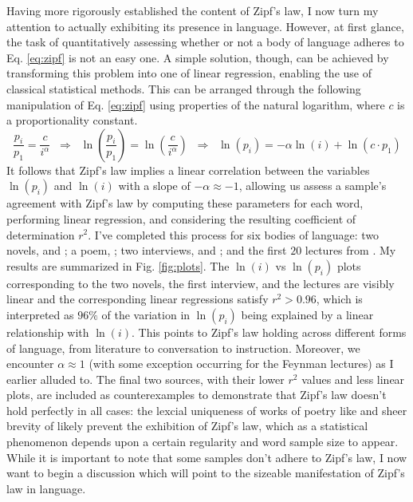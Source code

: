 \documentclass[10pt]{article}
\begin{document}
\begin{flushleft}
    \hspace*{0.5in} Having more rigorously established the content of Zipf's law, I now turn my attention to actually exhibiting its presence in language. However, at first glance, the task of quantitatively assessing whether or not a body of language adheres to Eq. \ref{eq:zipf} is not an easy one. A simple solution, though, can be achieved by transforming this problem into one of linear regression, enabling the use of classical statistical methods. This can be arranged through the following manipulation of Eq. \ref{eq:zipf} using properties of the natural logarithm, where $c$ is a proportionality constant.
    \begin{equation}
        \frac{p_i}{p_1} = \frac{c}{i^\alpha} \;\; \Longrightarrow \;\; \ln\left(\frac{p_i}{p_1}\right) = \ln\left(\frac{c}{i^\alpha}\right) \;\; \Longrightarrow \;\; \ln(p_i) = -\alpha\ln(i) + \ln(c \cdot p_1) \label{eq:log}
    \end{equation}
    It follows that Zipf's law implies a linear correlation between the variables $\ln(p_i)$ and $\ln(i)$ with a slope of $-\alpha \approx -1$, allowing us assess a sample's agreement with Zipf's law by computing these parameters for each word, performing linear regression, and considering the resulting coefficient of determination $r^2$. I've completed this process for six bodies of language: two novels, \textcite{Moby-Dick} and \textcite{Ulysses}; a poem, \textcite{paradiselost}; two interviews, \textcite{trump} and \textcite{capone}; and the first $20$ lectures from \textcite{feynman}. My results are summarized in Fig. \ref{fig:plots}. The $\ln(i)$ vs $\ln(p_i)$ plots corresponding to the two novels, the first interview, and the lectures are visibly linear and the corresponding linear regressions satisfy $r^2 > 0.96$, which is interpreted as $96\%$ of the variation in $\ln(p_i)$ being explained by a linear relationship with $\ln(i)$. This points to Zipf's law holding across different forms of language, from literature to conversation to instruction. Moreover, we encounter $\alpha \approx 1$ (with some exception occurring for the Feynman lectures) as I earlier alluded to. The final two sources, with their lower $r^2$ values and less linear plots, are included as counterexamples to demonstrate that Zipf's law doesn't hold perfectly in all cases: the lexcial uniqueness of works of poetry like \textcite{paradiselost} and sheer brevity of \textcite{capone} likely prevent the exhibition of Zipf's law, which as a statistical phenomenon depends upon a certain regularity and word sample size to appear. While it is important to note that some samples don't adhere to Zipf's law, I now want to begin a discussion which will point to the sizeable manifestation of Zipf's law in language.
    

\end{flushleft}
\end{document}
